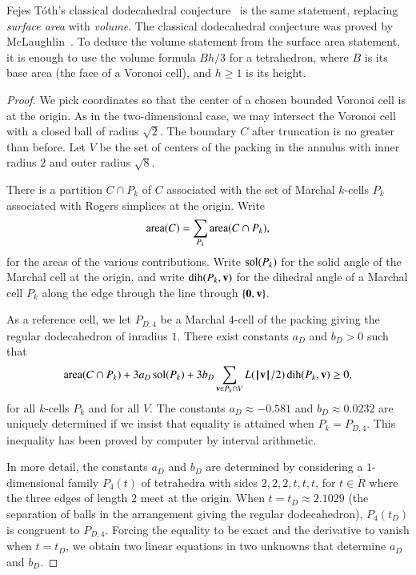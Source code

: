 \documentclass{llncs}
\def\area{\op{area}}
\begin{document}
\begin{remark} Fejes T\'oth's classical dodecahedral
  conjecture~\cite{Toth:1943:MZ} is the same statement, replacing {\it
    surface area} with {\it volume}.  The classical dodecahedral
  conjecture was proved by McLaughlin~\cite{Hales:2010:Dodec}.  To
  deduce the volume statement from the surface area statement, it is
  enough to use the volume formula $B h/3$ for a tetrahedron, where
  $B$ is its base area (the face of a Voronoi cell), and $h\ge 1$ is
  its height.
\end{remark}

\begin{proof}
  We pick coordinates so that the center of a chosen bounded Voronoi
  cell is at the origin.  As in the two-dimensional case, we may
  intersect the Voronoi cell with a closed ball of radius $\sqrt2$.
  The boundary $C$ after truncation is no greater than before.  Let
  $V$ be the set of centers of the packing in the annulus with inner
  radius $2$ and outer radius $\sqrt8$.

There is a partition $C\cap P_k$ of  $C$ associated with the set of
Marchal $k$-cells $P_k$ associated with  Rogers simplices at the origin. 
Write 
\[
\area(C) = \sum_{P_k} \area(C\cap P_k),
\]
for the areas of the various contributions.  Write $\operatorname{sol}(P_k)$ for the
solid angle of the Marchal cell at the origin, and write
$\operatorname{dih}(P_k,{\mathbf v})$ for the dihedral angle of a Marchal cell $P_k$ along
the edge through the line through $\{{\mathbf 0},{\mathbf v}\}$.

As a reference cell, we let $P_{D,4}$ be a Marchal $4$-cell of the
packing giving the regular dodecahedron of inradius $1$.  There exist
constants $a_D$ and $b_D>0$ such that
\begin{equation}\label{eqn:dodec}
\area(C\cap P_k) +  3 a_D \sol(P_k) + 
3 b_D \sum_{\v\in P_k\cap V} L(\normo{\v}/2)\dih(P_k,\v) \ge0,
\end{equation}
for all $k$-cells $P_k$ and for all $V$.  The constants $a_D\approx -0.581$ and
$b_D\approx 0.0232$ are uniquely determined if we insist that equality
is attained when $P_k = P_{D,4}$.  This inequality has been proved by
computer by interval arithmetic.  

In more detail, the constants $a_D$
and $b_D$ are determined by considering a $1$-dimensional family
$P_4(t)$ of tetrahedra with sides $2,2,2,t,t,t$, for $t\in \ring{R}$
where the three edges of length $2$ meet at the origin.  When
$t=t_D\approx 2.1029$ (the separation of balls in the arrangement
giving the regular dodecahedron), $P_4(t_D)$ is congruent to
$P_{D,4}$.  Forcing the equality to be exact and the derivative to
vanish when $t=t_D$, we obtain two linear equations in two unknowns
that determine $a_D$ and $b_D$.


\end{proof}
\end{document}
